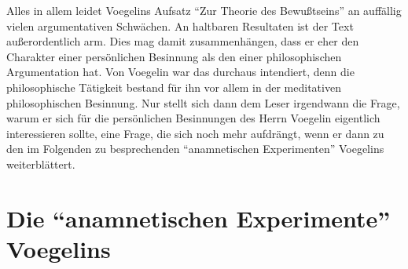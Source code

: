 Alles in allem leidet Voegelins Aufsatz "`Zur Theorie des Bewußtseins"' an
auffällig vielen argumentativen Schwächen. An haltbaren Resultaten ist der
Text außerordentlich arm. Dies mag damit zusammenhängen, dass er eher den
Charakter einer persönlichen Besinnung als den einer philosophischen
Argumentation hat. Von Voegelin war das durchaus intendiert, denn die
philosophische Tätigkeit bestand für ihn vor allem in der meditativen
philosophischen Besinnung. Nur stellt sich dann dem Leser irgendwann die
Frage, warum er sich für die persönlichen Besinnungen des Herrn Voegelin
eigentlich interessieren sollte, eine Frage, die sich noch mehr aufdrängt,
wenn er dann zu den im Folgenden zu besprechenden "`anamnetischen
Experimenten"' Voegelins weiterblättert.

\section{Die "`anamnetischen Experimente"' Voegelins}

